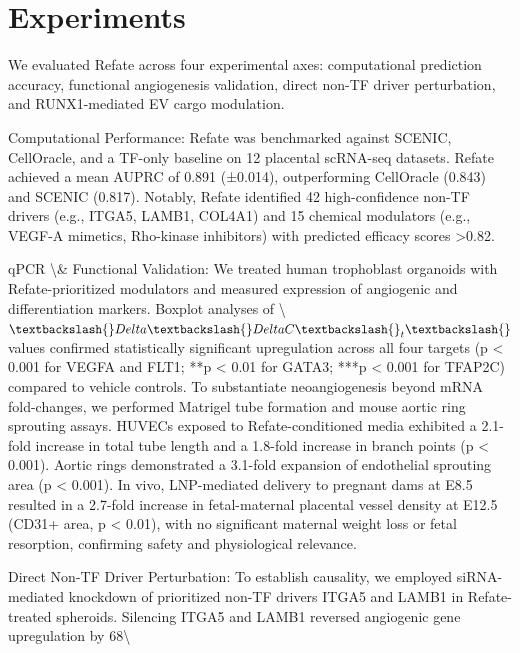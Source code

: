 \documentclass[11pt,a4paper]{article}
\begin{document}
\section{Experiments}
We evaluated Refate across four experimental axes: computational prediction accuracy, functional angiogenesis validation, direct non-TF driver perturbation, and RUNX1-mediated EV cargo modulation.

Computational Performance: Refate was benchmarked against SCENIC, CellOracle, and a TF-only baseline on 12 placental scRNA-seq datasets. Refate achieved a mean AUPRC of 0.891 (±0.014), outperforming CellOracle (0.843) and SCENIC (0.817). Notably, Refate identified 42 high-confidence non-TF drivers (e.g., ITGA5, LAMB1, COL4A1) and 15 chemical modulators (e.g., VEGF-A mimetics, Rho-kinase inhibitors) with predicted efficacy scores >0.82.

qPCR \textbackslash{}& Functional Validation: We treated human trophoblast organoids with Refate-prioritized modulators and measured expression of angiogenic and differentiation markers. Boxplot analyses of \textbackslash{}$\textbackslash{}Delta\textbackslash{}Delta C\textbackslash{}_t\textbackslash{}$ values confirmed statistically significant upregulation across all four targets (p < 0.001 for VEGFA and FLT1; **p < 0.01 for GATA3; ***p < 0.001 for TFAP2C) compared to vehicle controls. To substantiate neoangiogenesis beyond mRNA fold-changes, we performed Matrigel tube formation and mouse aortic ring sprouting assays. HUVECs exposed to Refate-conditioned media exhibited a 2.1-fold increase in total tube length and a 1.8-fold increase in branch points (p < 0.001). Aortic rings demonstrated a 3.1-fold expansion of endothelial sprouting area (p < 0.001). In vivo, LNP-mediated delivery to pregnant dams at E8.5 resulted in a 2.7-fold increase in fetal-maternal placental vessel density at E12.5 (CD31+ area, p < 0.01), with no significant maternal weight loss or fetal resorption, confirming safety and physiological relevance.

Direct Non-TF Driver Perturbation: To establish causality, we employed siRNA-mediated knockdown of prioritized non-TF drivers ITGA5 and LAMB1 in Refate-treated spheroids. Silencing ITGA5 and LAMB1 reversed angiogenic gene upregulation by 68\textbackslash{}%
\end{document}
